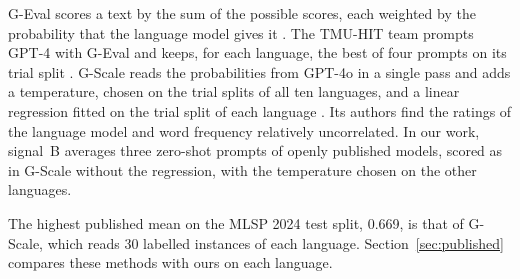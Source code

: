 G-Eval scores a text by the sum of the possible scores, each weighted by the probability that the %
language model gives it \citep{liu-etal-2023-geval}. The TMU-HIT team prompts GPT-4 with G-Eval %
and keeps, for each language, the best of four prompts on its trial split %
\citep{enomoto-etal-2024-tmu}. G-Scale reads the probabilities from GPT-4o in a single pass and %
adds a temperature, chosen on the trial splits of all ten languages, and a linear regression %
fitted on the trial split of each language \citep{nohejl-etal-2025-japanese}. Its authors find %
the ratings of the language model and word frequency relatively uncorrelated. In our work,
signal~B averages three zero-shot prompts of openly published models, scored as in G-Scale %
without the regression, with the temperature chosen on the other languages.

The highest published mean on the MLSP 2024 test split, 0.669, is that of G-Scale, which reads %
30 labelled instances of each language. Section~\ref{sec:published} compares these methods with
ours on each language.

